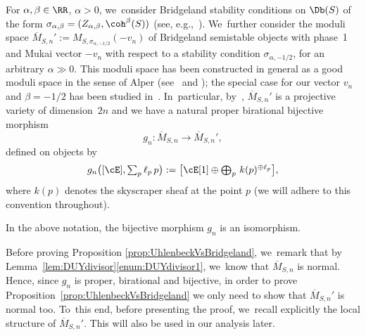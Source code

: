 For $\alpha,\beta\in\RR$, $\alpha>0$, we~consider Bridgeland stability conditions on $\Db(S)$ of the form $\sigma_{\alpha,\beta}=(Z_{\alpha,\beta},\coh^\beta(S))$ (see, e.g.,~\cite[Ex.\,3.7]{involutions1}). We~further consider the moduli space $\overline{M}{}_{S,n}':=M_{S,\sigma_{\alpha,-1/2}}(-v_n)$ of Bridgeland semistable objects with phase~1 and Mukai vector $-v_n$ with respect to a stability condition $\sigma_{\alpha,-1/2}$, for an arbitrary $\alpha\gg 0$.
This moduli space has been constructed in general as a good moduli space in the sense of Alper (see~\cite{Alper:GoodModuli,AHLH:Moduli} and \cite[Th.\,21.24]{BLMNPS:family}); the special case for our vector $v_n$ and $\beta=-1/2$ has been studied in~\cite{Tajakka:Uhlenbeck}. In~particular, by~\cite[Th.\,1.1]{Tajakka:Uhlenbeck}, $\overline{M}{}_{S,n}'$ is a projective variety of dimension~$2n$ and we have a natural proper birational bijective morphism
\[
g_n\colon \overline{M}_{S,n} \to \overline{M}{}_{S,n}',
\]
defined on objects by
\begin{equation}\label{eq:GiesekerToDUY}\textstyle
g_n\bigl([\cE],\sum_p \ell_p\, p\bigr):=\bigl[\cE[1]\oplus \bigoplus_p\, k(p)^{\oplus \ell_p}\bigr],
\end{equation}
where $k(p)$ denotes the skyscraper sheaf at the point $p$ (we will adhere to this convention throughout).

\begin{prop}\label{prop:UhlenbeckVsBridgeland}
In the above notation, the bijective morphism $g_n$ is an isomorphism.
\end{prop}

Before proving Proposition \ref{prop:UhlenbeckVsBridgeland}, we~remark that by Lemma~\ref{lem:DUYdivisor}\ref{enum:DUYdivisor1}, we~know that $\overline{M}_{S,n}$ is normal.
Hence, since $g_n$ is proper, birational and bijective, in order to prove Proposition~\ref{prop:UhlenbeckVsBridgeland} we only need to show that $\overline{M}{}_{S,n}'$ is normal too. To~this end, before presenting the proof, we~recall explicitly the local structure of $\overline{M}{}_{S,n}'$. This will also be used in our analysis later.

